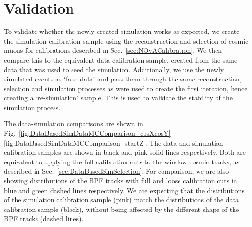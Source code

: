 \section{Validation}\label{sec:DataBasedSimValidation}
To validate whether the newly created simulation works as expected, we create the simulation calibration sample using the reconstruction and selection of cosmic muons for calibrations described in Sec.~\ref{sec:NOvACalibration}. We then compare this to the equivalent data calibration sample, created from the same data that was used to seed the simulation. Additionally, we use the newly simulated events as `fake data' and pass them through the same reconstruction, selection and simulation processes as were used to create the first iteration, hence creating a `re-simulation' sample. This is used to validate the stability of the simulation process.

The data-simulation comparisons are shown in Fig.~\ref{fig:DataBasedSimDataMCComparison_cosXcosY}-\ref{fig:DataBasedSimDataMCComparison_startZ}. The data and simulation calibration samples are shown in black and pink solid lines respectively. Both are equivalent to applying the full calibration cuts to the window cosmic tracks, as described in Sec.~\ref{sec:DataBasedSimSelection}. For comparison, we are also showing distributions of the \gls{BPF} tracks with full and loose calibration cuts in blue and green dashed lines respectively. We are expecting that the distributions of the simulation calibration sample (pink) match the distributions of the data calibration sample (black), without being affected by the different shape of the \gls{BPF} tracks (dashed lines).

